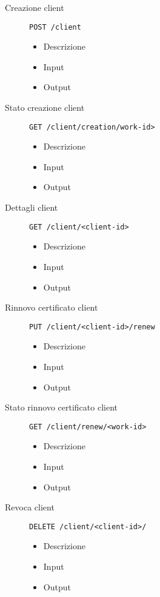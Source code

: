 \begin{description}
    \item[Creazione client]\texttt{POST /client}
    \begin{itemize}
        \item Descrizione
        \item Input
        \item Output
    \end{itemize}

    \item[Stato creazione client]\texttt{GET /client/creation/work-id>}
    \begin{itemize}
        \item Descrizione
        \item Input
        \item Output
    \end{itemize}

    \item[Dettagli client]\texttt{GET /client/<client-id>}
    \begin{itemize}
        \item Descrizione
        \item Input
        \item Output
    \end{itemize}

    \item[Rinnovo certificato client]\texttt{PUT /client/<client-id>/renew}
    \begin{itemize}
        \item Descrizione
        \item Input
        \item Output
    \end{itemize}

    \item[Stato rinnovo certificato client]\texttt{GET /client/renew/<work-id>}
    \begin{itemize}
        \item Descrizione
        \item Input
        \item Output
    \end{itemize}

    \item[Revoca client]\texttt{DELETE /client/<client-id>/}
    \begin{itemize}
        \item Descrizione
        \item Input
        \item Output
    \end{itemize}


\end{description}
